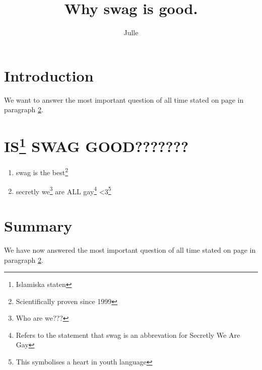 \documentclass[a4paper, titlepage]{article}
\title{Why swag is good.}
\author{Julle}
\begin{document}
\maketitle

\section{Introduction}
We want to answer the most important question of all time stated on page \pageref{sweg} in paragraph \ref{sweg}.

\section{IS\footnote{Islamiska staten} SWAG GOOD???????}\label{sweg}

\begin{enumerate}
\item swag is the best\footnote{Scientifically proven since 1999}
\item secretly we\footnote{Who are we???} are ALL gay\footnote{Refers to the statement that swag is an abbrevation for Secretly We Are Gay} <3\footnote{This symbolises a heart in youth language}
\end{enumerate}

\section{Summary}
We have now answered the most important question of all time stated on page \pageref{sweg} in paragraph \ref{sweg}.
\end{document}
